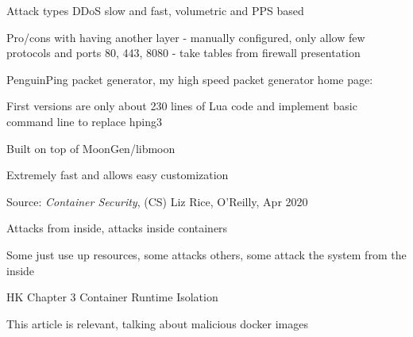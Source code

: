 \documentclass[Screen16to9,17pt]{foils}
\begin{document}

\begin{list2}
\item Attack types DDoS slow and fast, volumetric and PPS based
\item Pro/cons with having another layer - manually configured, only allow few protocols and ports 80, 443, 8080
- take tables from firewall presentation
\end{list2}




\begin{list2}
\item PenguinPing packet generator, my high speed packet generator
home page: 
\item First versions are only about 230 lines of Lua code and implement basic command line to replace hping3
\item Built on top of MoonGen/libmoon 
\end{list2}

\centerline{Extremely fast and allows easy customization}



Source: \emph{Container Security}, (CS) Liz Rice, O'Reilly, Apr 2020

\begin{list2}
\item Attacks from inside, attacks inside containers
\item Some just use up resources, some attacks others, some attack the system from the inside
\end{list2}


\begin{list2}
\item HK Chapter 3 Container Runtime Isolation
\end{list2}



This article is relevant, talking about malicious docker images\\
\end{document}
